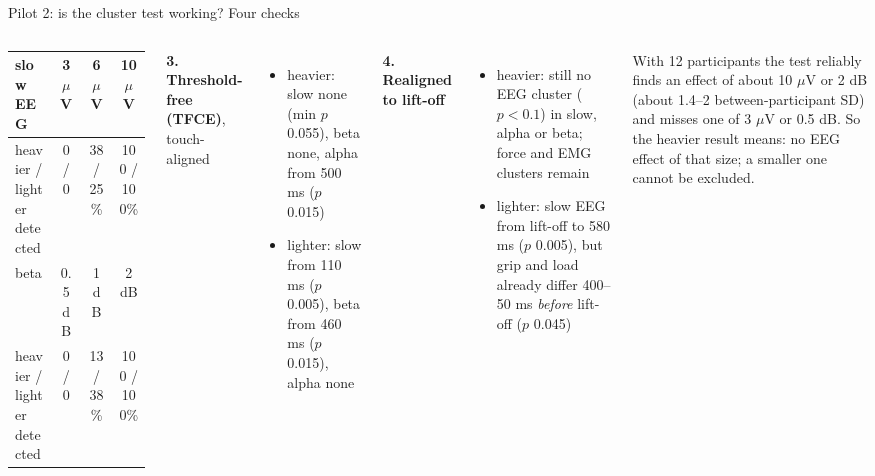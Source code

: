 \documentclass[aspectratio=169,10pt]{beamer}
\begin{document}
\begin{frame}{Pilot 2: is the cluster test working? Four checks}
\begin{columns}[T]
    \smallskip
    \centering\scriptsize
    \begin{tabular}{lccc}
      \toprule
      slow EEG & 3 $\mu$V & 6 $\mu$V & 10 $\mu$V \\
      \midrule
      heavier / lighter detected & 0 / 0 & 38 / 25\% & 100 / 100\% \\
      \midrule
      beta & 0.5 dB & 1 dB & 2 dB \\
      \midrule
      heavier / lighter detected & 0 / 0 & 13 / 38\% & 100 / 100\% \\
      \bottomrule
    \end{tabular}
    \textbf{3. Threshold-free (TFCE)}, touch-aligned
    \begin{itemize}\scriptsize
      \item heavier: slow none (min $p$ 0.055), beta none, alpha from 500 ms ($p$ 0.015)
      \item lighter: slow from 110 ms ($p$ 0.005), beta from 460 ms ($p$ 0.015), alpha none
    \end{itemize}
    \textbf{4. Realigned to lift-off}
    \begin{itemize}\scriptsize
      \item heavier: still no EEG cluster ($p<0.1$) in slow, alpha or beta; force and EMG clusters remain
      \item lighter: slow EEG from lift-off to 580 ms ($p$ 0.005), but grip and load already differ
            400--50 ms \emph{before} lift-off ($p$ 0.045)
    \end{itemize}
    \begin{tcolorbox}[askbox,title={What ``no cluster'' means}]
      \scriptsize With 12 participants the test reliably finds an effect of about 10 $\mu$V or 2 dB (about 1.4--2
      between-participant SD) and misses one of 3 $\mu$V or 0.5 dB. So the heavier result means: no EEG effect of
      that size; a smaller one cannot be excluded.
    \end{tcolorbox}
  \end{columns}
\end{frame}
\end{document}
